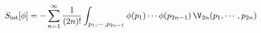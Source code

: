 \begin{equation}
S_{\text{int}} [\phi] = - \sum_{n=1}^\infty \frac{1}{(2n)!}
\int_{p_1,\cdots, p_{2n-1}} \phi (p_1) \cdots \phi (p_{2n-1})\,
\V_{2n} (p_1, \cdots, p_{2n}) \label{expansion}
\end{equation}

